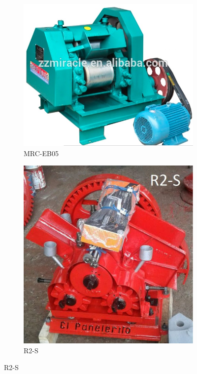 \documentclass{article}%
\begin{document}
\begin{figure}[h!]%
\begin{subfigure}{0.33\linewidth}%
\includegraphics[width=0.95\linewidth]{Molinos/MRC-EB05.jpg}%
\caption{MRC{-}EB05}%
\end{subfigure}%
\begin{subfigure}{0.33\linewidth}%
\includegraphics[width=0.95\linewidth]{Molinos/R2-S.jpg}%
\caption{R2{-}S}%
\end{subfigure}%
\linebreak%
\newpage%
\end{figure}
\end{document}
